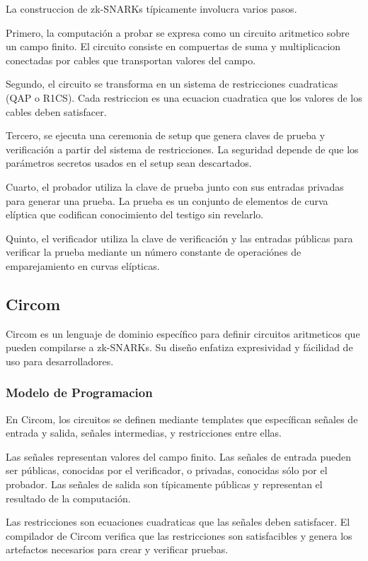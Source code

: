 \documentclass[12pt,a4paper,twoside]{book}
\begin{document}
La construccion de zk-SNARKs típicamente involucra varios pasos.

Primero, la computación a probar se expresa como un circuito aritmetico sobre un campo finito. El circuito consiste en compuertas de suma y multiplicacion conectadas por cables que transportan valores del campo.

Segundo, el circuito se transforma en un sistema de restricciones cuadraticas (QAP o R1CS). Cada restriccion es una ecuacion cuadratica que los valores de los cables deben satisfacer.

Tercero, se ejecuta una ceremonia de setup que genera claves de prueba y verificación a partir del sistema de restricciones. La seguridad depende de que los parámetros secretos usados en el setup sean descartados.

Cuarto, el probador utiliza la clave de prueba junto con sus entradas privadas para generar una prueba. La prueba es un conjunto de elementos de curva elíptica que codifican conocimiento del testigo sin revelarlo.

Quinto, el verificador utiliza la clave de verificación y las entradas públicas para verificar la prueba mediante un número constante de operaciónes de emparejamiento en curvas elípticas.

\subsection{Circom}

Circom es un lenguaje de dominio específico para definir circuitos aritmeticos que pueden compilarse a zk-SNARKs. Su diseño enfatiza expresividad y fácilidad de uso para desarrolladores.

\subsubsection{Modelo de Programacion}

En Circom, los circuitos se definen mediante templates que específican señales de entrada y salida, señales intermedias, y restricciones entre ellas.

Las señales representan valores del campo finito. Las señales de entrada pueden ser públicas, conocidas por el verificador, o privadas, conocidas sólo por el probador. Las señales de salida son típicamente públicas y representan el resultado de la computación.

Las restricciones son ecuaciones cuadraticas que las señales deben satisfacer. El compilador de Circom verifica que las restricciones son satisfacibles y genera los artefactos necesarios para crear y verificar pruebas.
\end{document}
